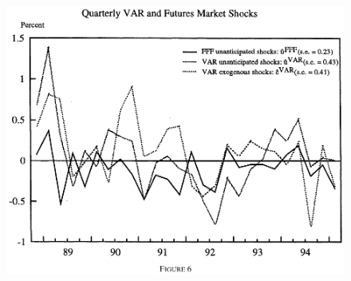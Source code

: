 \documentclass{beamer}
\begin{document}
\begin{frame}
  \begin{figure}
    \includegraphics[scale=.7]{rudebusch.eps}
  \end{figure}
\end{frame}
\end{document}
